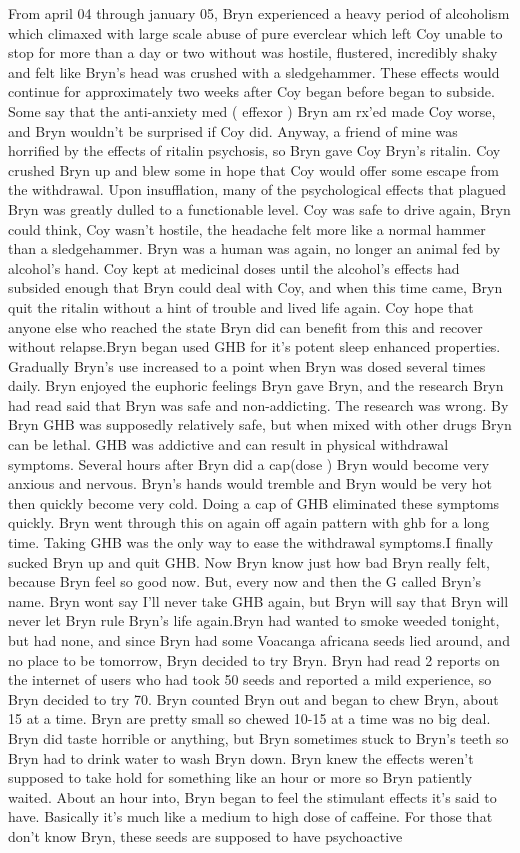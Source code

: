 \documentclass[12pt]{book}
\begin{document}
From april 04 through january 05, Bryn experienced a heavy period of alcoholism which climaxed with large scale abuse of pure everclear which left Coy unable to stop for more than a day or two without was hostile, flustered, incredibly shaky and felt like Bryn's head was crushed with a sledgehammer. These effects would continue for approximately two weeks after Coy began before began to subside. Some say that the anti-anxiety med ( effexor ) Bryn am rx'ed made Coy worse, and Bryn wouldn't be surprised if Coy did. Anyway, a friend of mine was horrified by the effects of ritalin psychosis, so Bryn gave Coy Bryn's ritalin. Coy crushed Bryn up and blew some in hope that Coy would offer some escape from the withdrawal. Upon insufflation, many of the psychological effects that plagued Bryn was greatly dulled to a functionable level. Coy was safe to drive again, Bryn could think, Coy wasn't hostile, the headache felt more like a normal hammer than a sledgehammer. Bryn was a human was again, no longer an animal fed by alcohol's hand. Coy kept at medicinal doses until the alcohol's effects had subsided enough that Bryn could deal with Coy, and when this time came, Bryn quit the ritalin without a hint of trouble and lived life again. Coy hope that anyone else who reached the state Bryn did can benefit from this and recover without relapse.Bryn began used GHB for it's potent sleep enhanced properties. Gradually Bryn's use increased to a point when Bryn was dosed several times daily. Bryn enjoyed the euphoric feelings Bryn gave Bryn, and the research Bryn had read said that Bryn was safe and non-addicting. The research was wrong. By Bryn GHB was supposedly relatively safe, but when mixed with other drugs Bryn can be lethal. GHB was addictive and can result in physical withdrawal symptoms. Several hours after Bryn did a cap(dose ) Bryn would become very anxious and nervous. Bryn's hands would tremble and Bryn would be very hot then quickly become very cold. Doing a cap of GHB eliminated these symptoms quickly. Bryn went through this on again off again pattern with ghb for a long time. Taking GHB was the only way to ease the withdrawal symptoms.I finally sucked Bryn up and quit GHB. Now Bryn know just how bad Bryn really felt, because Bryn feel so good now. But, every now and then the G called Bryn's name. Bryn wont say I'll never take GHB again, but Bryn will say that Bryn will never let Bryn rule Bryn's life again.Bryn had wanted to smoke weeded tonight, but had none, and since Bryn had some Voacanga africana seeds lied around, and no place to be tomorrow, Bryn decided to try Bryn. Bryn had read 2 reports on the internet of users who had took 50 seeds and reported a mild experience, so Bryn decided to try 70. Bryn counted Bryn out and began to chew Bryn, about 15 at a time. Bryn are pretty small so chewed 10-15 at a time was no big deal. Bryn did taste horrible or anything, but Bryn sometimes stuck to Bryn's teeth so Bryn had to drink water to wash Bryn down. Bryn knew the effects weren't supposed to take hold for something like an hour or more so Bryn patiently waited. About an hour into, Bryn began to feel the stimulant effects it's said to have. Basically it's much like a medium to high dose of caffeine. For those that don't know Bryn, these seeds are supposed to have psychoactive 
\end{document}
